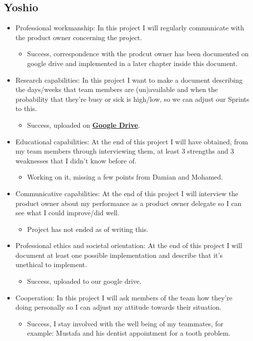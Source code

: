 \documentclass[12pt]{article}
\begin{document}
	\subsection{Yoshio}
	\begin{itemize}
		\item Professional workmanship:	In this project I will regularly communicate with the product owner concerning the project.
		\begin{itemize}
			\item Success, correspondence with the prodcut owner has been documented on google drive and implemented in a later chapter inside this document. 
		\end{itemize}
		\item Research capabilities: In this project I want to make a document describing the days/weeks that team members are (un)available and when the probability that they're busy or sick is high/low, so we can adjust our Sprints to this.
		\begin{itemize}
			\item Success, uploaded on \href{https://drive.google.com/drive/folders/1IJEu7igVdK12MzVx3jkXZMvB5HUXFuYZ?usp=sharing}{\textbf{Google Drive}}.
		\end{itemize}
		\item Educational capabilities:	At the end of this project I will have obtained, from my team members through interviewing them, at least 3 strengths and 3 weaknesses that I didn't know before of.
		\begin{itemize}
			\item Working on it, missing a few points from Damian and Mohamed.
		\end{itemize}
		\item Communicative capabilities: At the end of this project I will interview the product owner about my performance as a product owner delegate so I can see what I could improve/did well.
		\begin{itemize}
			\item Project has not ended as of writing this.
		\end{itemize}
		\item Professional ethics and societal orientation: At the end of this project I will document at least one possible implementation and describe that it's unethical to implement.
		\begin{itemize}
			\item Success, uploaded to our google drive.
		\end{itemize}
		\item Cooperation: In this project I will ask members of the team how they're doing personally so I can adjust my attitude towards their situation.
		\begin{itemize}
			\item Success, I stay involved with the well being of my teammates, for example: Mustafa and his dentist appointment for a tooth problem.
		\end{itemize}
	\end{itemize}
	\newpage
\end{document}
